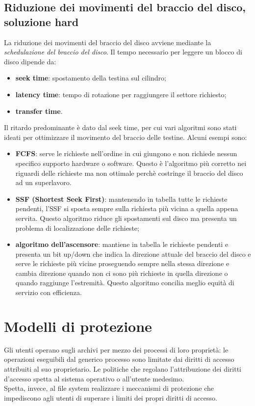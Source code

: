 \documentclass[12pt, letterpaper]{report}
\begin{document}
	\subsection{Riduzione dei movimenti del braccio del disco, soluzione hard} La riduzione dei movimenti del braccio del disco avviene mediante la \textit{schedulazione del braccio del disco}. Il tempo necessario per leggere un blocco di disco dipende da:
	\begin{itemize}
		\item \textbf{seek time}: spostamento della testina sul cilindro;
		\item \textbf{latency time}: tempo di rotazione per raggiungere il settore richiesto;
		\item \textbf{transfer time}.
	\end{itemize}
	Il ritardo predominante è dato dal seek time, per cui vari algoritmi sono stati ideati per ottimizzare il movimento del braccio delle testine. Alcuni esempi sono:
	\begin{itemize}
		\item \textbf{FCFS}: serve le richieste nell'ordine in cui giungono e non richiede nessun specifico supporto hardware o software. Questo è l'algoritmo più corretto nei riguardi delle richieste ma non ottimale perchè costringe il braccio del disco ad un superlavoro.
		\item \textbf{SSF (Shortest Seek First)}: mantenendo in tabella tutte le richieste pendenti, l'SSF si sposta sempre sulla richiesta più vicina a quella appena servita. Questo algoritmo riduce gli spostamenti sul disco ma presenta un problema di localizzazione delle richieste;
		\item \textbf{algoritmo dell'ascensore}: mantiene in tabella le richieste pendenti e presenta un bit up/down che indica la direzione attuale del braccio del disco e serve le richieste più vicine proseguendo sempre nella stessa direzione e cambia direzione quando non ci sono più richieste in quella direzione o quando raggiunge l'estremità. Questo algoritmo concilia meglio equità di servizio con efficienza.
	\end{itemize}
	\section{Modelli di protezione} Gli utenti operano sugli archivi per mezzo dei processi di loro proprietà: le operazioni eseguibili dal generico processo sono limitate dai diritti di accesso attribuiti al suo proprietario. Le politiche che regolano l'attribuzione dei diritti d'accesso spetta al sistema operativo o all'utente medesimo. \\
	Spetta, invece, al file system realizzare i meccanismi di protezione che impediscono agli utenti di superare i limiti dei propri diritti di accesso. \\
\end{document}
